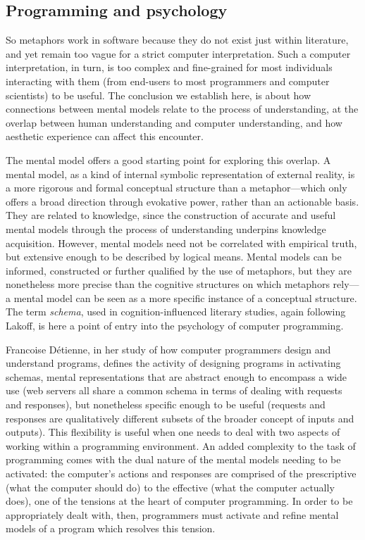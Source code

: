 \documentclass{article}
\begin{document}
\vspace{1\baselineskip}

\subsection{Programming and psychology}

So metaphors work in software because they do not exist just within literature, and yet remain too vague for a strict computer interpretation. Such a computer interpretation, in turn, is too complex and fine-grained for most individuals interacting with them (from end-users to most programmers and computer scientists) to be useful. The conclusion we establish here, is about how connections between mental models relate to the process of understanding, at the overlap between human understanding and computer understanding, and how aesthetic experience can affect this encounter.

The mental model offers a good starting point for exploring this overlap. A mental model, as a kind of internal symbolic representation of external reality, is a more rigorous and formal conceptual structure than a metaphor—which only offers a broad direction through evokative power, rather than an actionable basis. They are related to knowledge, since the construction of accurate and useful mental models through the process of understanding underpins knowledge acquisition. However, mental models need not be correlated with empirical truth, but extensive enough to be described by logical means. Mental models can be informed, constructed or further qualified by the use of metaphors, but they are nonetheless more precise than the cognitive structures on which metaphors rely—a mental model can be seen as a more specific instance of a conceptual structure. The term \emph{schema}, used in cognition-influenced literary studies, again following Lakoff, is here a point of entry into the psychology of computer programming.

Francoise Détienne, in her study of how computer programmers design and understand programs\cite{detienne_software_2012}, defines the activity of designing programs in activating schemas, mental representations that are abstract enough to encompass a wide use (web servers all share a common schema in terms of dealing with requests and responses), but nonetheless specific enough to be useful (requests and responses are qualitatively different subsets of the broader concept of inputs and outputs). This flexibility is useful when one needs to deal with two aspects of working within a programming environment. An added complexity to the task of programming comes with the dual nature of the mental models needing to be activated: the computer's actions and responses are comprised of the prescriptive (what the computer should do) to the effective (what the computer actually does), one of the tensions at the heart of computer programming. In order to be appropriately dealt with, then, programmers must activate and refine mental models of a program which resolves this tension.
\end{document}
